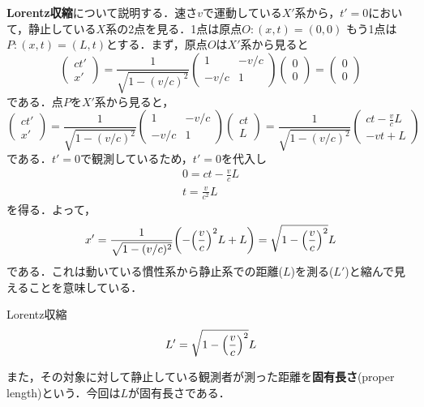 \documentclass{report}
\begin{document}
  \textbf{Lorentz収縮}について説明する．速さ$v$で運動している$X'$系から，$t'=0$において，静止している$X$系の2点を見る．1点は原点$O:(x,t)=(0,0)$
  もう1点は$P:(x,t)=(L,t)$とする．まず，原点$O$は$X'$系から見ると
  \begin{equation}
    \begin{pmatrix}
      ct' \\ x'
    \end{pmatrix}
    =
    \frac{1}{\sqrt{1 - (v/c)^2}}
    \begin{pmatrix}
      1 & -v/c\\
      -v/c & 1
    \end{pmatrix}
    \begin{pmatrix}
      0\\0
    \end{pmatrix}
    =
    \begin{pmatrix}
      0\\0
    \end{pmatrix}
  \end{equation}
  である．点$P$を$X'$系から見ると，
  \begin{equation}
    \begin{pmatrix}
      ct' \\ x'
    \end{pmatrix}
    =
    \frac{1}{\sqrt{1 - (v/c)^2}}
    \begin{pmatrix}
      1 & -v/c\\
      -v/c & 1
    \end{pmatrix}
    \begin{pmatrix}
      ct\\L
    \end{pmatrix}
    =
    \frac{1}{\sqrt{1 - (v/c)^2}}
    \begin{pmatrix}
      ct - \frac{v}{c}L\\-vt + L
    \end{pmatrix}
  \end{equation}
  である．$t'=0$で観測しているため，$t'=0$を代入し
  \begin{align}
    0 = ct - \frac{v}{c}L\\
    t = \frac{v}{c^2}L
  \end{align}
  を得る．よって，
  \begin{align}
    x' = \frac{1}{\sqrt{1 - (v/c)^2}} \qty(-\qty(\frac{v}{c})^2 L + L) = \sqrt{1-\qty(\frac{v}{c})^2}L
  \end{align}
  である．これは動いている慣性系から静止系での距離($L$)を測る($L'$)と縮んで見えることを意味している．
  \begin{itembox}[l]{Lorentz収縮}
    \begin{equation}
      L' = \sqrt{1-\qty(\frac{v}{c})^2}L
    \end{equation}
  \end{itembox}
  また，その対象に対して静止している観測者が測った距離を\textbf{固有長さ}(proper length)という．今回は$L$が固有長さである．
\end{document}
